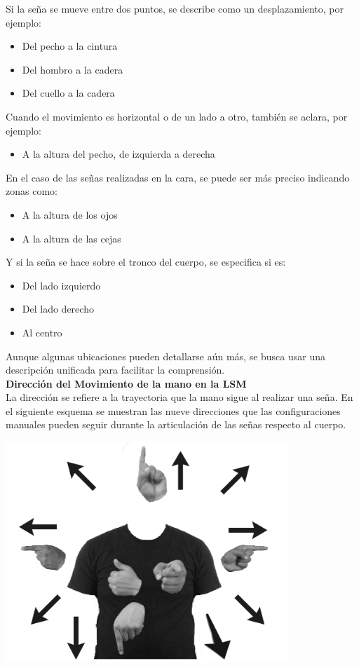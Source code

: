 Si la seña se mueve entre dos puntos, se describe como un desplazamiento, por ejemplo:

\begin{itemize}
    \item Del pecho a la cintura
    \item Del hombro a la cadera
    \item Del cuello a la cadera
\end{itemize}

Cuando el movimiento es horizontal o de un lado a otro, también se aclara, por ejemplo:
\begin{itemize}
    \item A la altura del pecho, de izquierda a derecha
\end{itemize}

En el caso de las señas realizadas en la cara, se puede ser más preciso indicando zonas como:
\begin{itemize}
    \item A la altura de los ojos
    \item A la altura de las cejas    
\end{itemize}

Y si la seña se hace sobre el tronco del cuerpo, se especifica si es:
\begin{itemize}
    \item Del lado izquierdo
    \item Del lado derecho
    \item Al centro
\end{itemize}

Aunque algunas ubicaciones pueden detallarse aún más, se busca usar una descripción unificada para facilitar la comprensión.\\

\textbf{Dirección del Movimiento de la mano en la LSM}\\
La dirección se refiere a la trayectoria que la mano sigue al realizar una seña. En el siguiente esquema se muestran las nueve direcciones que las configuraciones manuales pueden seguir durante la articulación de las señas respecto al cuerpo.

\begin{center}
    \includegraphics[width=0.8\textwidth]{Images/Cap 2/Direccion_Manos_LSM.png}
\end{center}

